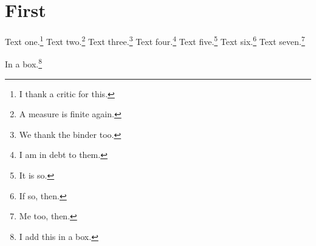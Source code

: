 \documentclass{scrbook}
\begin{document}
\chapter{First}
Text one.\footnote{I thank a critic for this.}
Text two.\footnote{A measure is finite again.}
Text three.\footnote{We thank the binder too.}
Text four.\footnote{I am in debt to them.}
Text five.\footnote{It is so.}
Text six.\footnote{If so, then.}
Text seven.\footnote{Me too, then.}

\begin{minipage}{0.8\textwidth}
In a box.\footnote{I add this in a box.}
\end{minipage}
\end{document}
